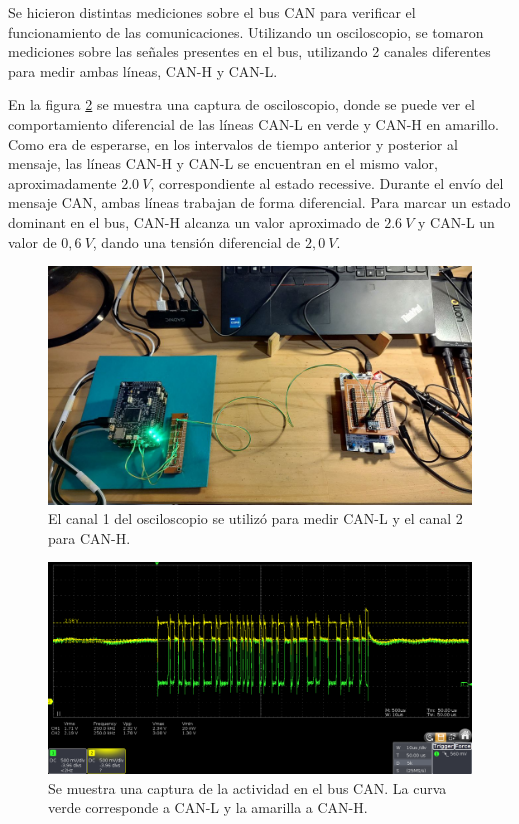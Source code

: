 Se hicieron distintas mediciones sobre el bus CAN para verificar el funcionamiento de las comunicaciones. Utilizando un osciloscopio, se tomaron mediciones sobre las señales presentes en el bus, utilizando 2 canales diferentes para medir ambas líneas, CAN-H y CAN-L. 

En la figura \ref{fig:mensaje_1_CANH} se muestra una captura de osciloscopio, donde se puede ver el comportamiento diferencial de las líneas CAN-L en verde y CAN-H en amarillo. Como era de esperarse, en los intervalos de tiempo anterior y posterior al mensaje, las líneas CAN-H y CAN-L se encuentran en el mismo valor, aproximadamente $2.0 \ V$, correspondiente al estado recessive. Durante el envío del mensaje CAN, ambas líneas trabajan de forma diferencial. Para marcar un estado dominant en el bus, CAN-H alcanza un valor aproximado de $2.6 \ V$ y CAN-L un valor de  $0,6 \ V$, dando una tensión diferencial de $2,0 \ V$.

\begin{figure}[H]
    \centering
    \includegraphics[width=\textwidth]{img/placas_con_osciloscopio.jpeg}
    \caption{El canal 1 del osciloscopio se utilizó para medir CAN-L y el canal 2 para CAN-H.}
    \label{fig:placas_con_osciloscopio}
\end{figure}

\begin{figure}[H]
    \centering
    \includegraphics[width=\textwidth]{img/mensaje_1_CANH.png}
    \caption{Se muestra una captura de la actividad en el bus CAN. La curva verde corresponde a CAN-L y la amarilla a CAN-H.}
    \label{fig:mensaje_1_CANH}
\end{figure}

